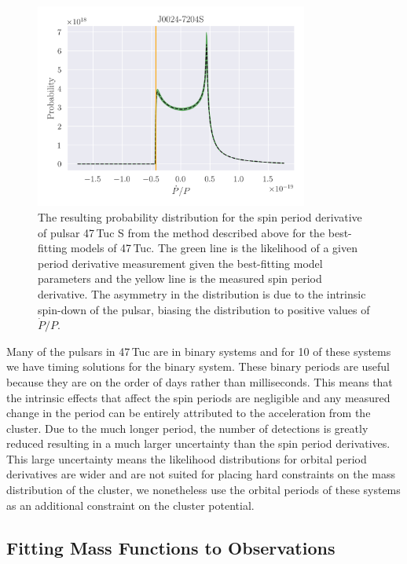 \begin{figure}
    \centering
    \includegraphics[width=0.8\textwidth]{figures/pulsar-likelihood.png}
    \caption{The resulting probability distribution for the spin period derivative of pulsar 47\,Tuc
        S from the method described above for the best-fitting models of 47\,Tuc. The green line is
        the likelihood of a given period derivative measurement given the best-fitting model
        parameters and the yellow line is the measured spin period derivative. The asymmetry in the
        distribution is due to the intrinsic spin-down of the pulsar, biasing the distribution to
        positive values of $\dot{P}/P$.}
    \label{fig:pulsar-likelihood}
\end{figure}

Many of the pulsars in 47\,Tuc are in binary systems and for 10 of these systems we have timing
solutions for the binary system. These binary periods are useful because they are on the order of
days rather than milliseconds. This means that the intrinsic effects that affect the spin periods
are negligible and any measured change in the period can be entirely attributed to the acceleration
from the cluster. Due to the much longer period, the number of detections is greatly reduced
resulting in a much larger uncertainty than the spin period derivatives. This large uncertainty
means the likelihood distributions for orbital period derivatives are wider and are not
suited for placing hard constraints on the mass distribution of the cluster, we nonetheless use the
orbital periods of these systems as an additional constraint on the cluster potential.


\subsection{Fitting Mass Functions to Observations}

